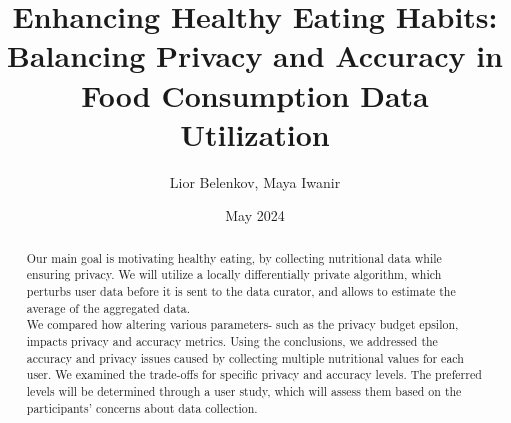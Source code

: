\documentclass[sigconf]{acmart}
\begin{document}


\title{Enhancing Healthy Eating Habits: Balancing Privacy and Accuracy in Food Consumption Data Utilization}
\author{Lior Belenkov, Maya Iwanir}
\date{May 2024}



\renewcommand{\shortauthors}{}

\begin{abstract}
Our main goal is motivating healthy eating, by collecting nutritional data while ensuring privacy. 
We will utilize a locally differentially private algorithm, which perturbs user data before it is sent to the data curator, and allows to estimate the average of the aggregated data. \\
 We compared how altering various parameters- such as the privacy budget epsilon, impacts privacy and accuracy metrics. Using the conclusions, we addressed the accuracy and privacy issues caused by collecting multiple nutritional values for each user. We examined the trade-offs for specific privacy and accuracy levels. The preferred levels will be determined through a user study, which will assess them based on the participants' concerns about data collection. 
\end{abstract}

\maketitle
\end{document}
